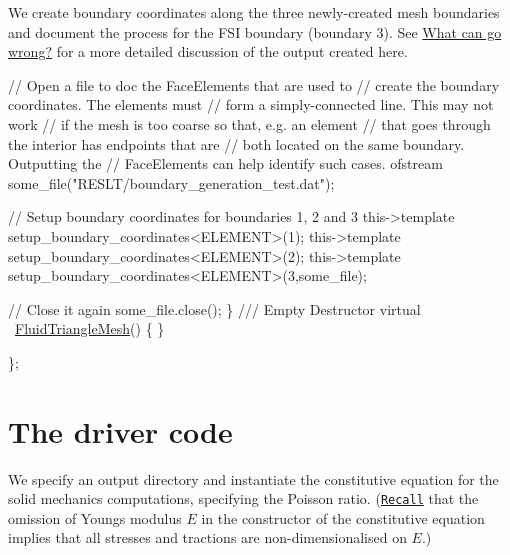 We create boundary coordinates along the three newly-\/created mesh boundaries and document the process for the F\+SI boundary (boundary 3). See \hyperlink{index_go_wrong}{What can go wrong?} for a more detailed discussion of the output created here.


\begin{DoxyCodeInclude}
   
   \textcolor{comment}{// Open a file to doc the FaceElements that are used to}
   \textcolor{comment}{// create the boundary coordinates. The elements must}
   \textcolor{comment}{// form a simply-connected line. This may not work}
   \textcolor{comment}{// if the mesh is too coarse so that, e.g. an element}
   \textcolor{comment}{// that goes through the interior has endpoints that are}
   \textcolor{comment}{// both located on the same boundary. Outputting the}
   \textcolor{comment}{// FaceElements can help identify such cases.}
   ofstream some\_file(\textcolor{stringliteral}{"RESLT/boundary\_generation\_test.dat"});
   
   \textcolor{comment}{// Setup boundary coordinates for boundaries 1, 2 and 3}
   this->\textcolor{keyword}{template} setup\_boundary\_coordinates<ELEMENT>(1);
   this->\textcolor{keyword}{template} setup\_boundary\_coordinates<ELEMENT>(2);
   this->\textcolor{keyword}{template} setup\_boundary\_coordinates<ELEMENT>(3,some\_file);

   \textcolor{comment}{// Close it again}
   some\_file.close();
  \}
 \textcolor{comment}{}
\textcolor{comment}{ /// Empty Destructor}
\textcolor{comment}{} \textcolor{keyword}{virtual} ~\hyperlink{classFluidTriangleMesh}{FluidTriangleMesh}() \{ \}

\};

\end{DoxyCodeInclude}




 

\hypertarget{index_main}{}\section{The driver code}\label{index_main}
We specify an output directory and instantiate the constitutive equation for the solid mechanics computations, specifying the Poisson ratio. (\href{../../../solid/solid_theory/html/index.html#non-dim_solid}{\tt Recall} that the omission of Young\textquotesingle{}s modulus $ E $ in the constructor of the constitutive equation implies that all stresses and tractions are non-\/dimensionalised on $ E $.)

